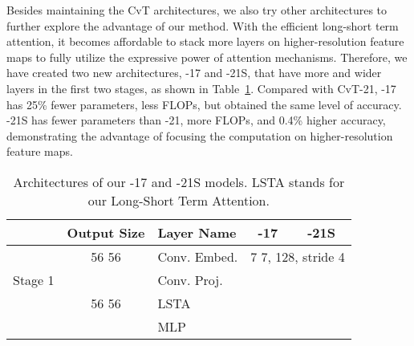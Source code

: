 Besides maintaining the CvT architectures, we also try other architectures to further explore the advantage of our method. With the efficient long-short term attention, it becomes affordable to stack more layers on higher-resolution feature maps to fully utilize the expressive power of attention mechanisms. Therefore, we have created two new architectures, \cvtname{}-17 and \cvtname{}-21S, that have more and wider layers in the first two stages, as shown in Table~\ref{tbl:cvt_customized}. Compared with CvT-21, \cvtname{}-17 has 25\% fewer parameters, less FLOPs, but obtained the same level of accuracy. \cvtname{}-21S has fewer parameters than \cvtname{}-21, more FLOPs, and 0.4\% higher accuracy, demonstrating the advantage of focusing the computation on higher-resolution feature maps.


\begin{table}[]
\centering
\caption{Architectures of our \cvtname{}-17 and \cvtname{}-21S models. LSTA stands for our Long-Short Term Attention.}
\label{tbl:cvt_customized}
\begin{tabular}{c|c|l|c|c}
\hline
                         & Output Size                  & Layer Name   & \cvtname{}-17                                                                                           & \cvtname{}-21S                                                                                          \\ \hline
\multirow{4}{*}{Stage 1} & 56  56                  & Conv. Embed. & \multicolumn{2}{c}{7  7, 128, stride 4}                                                                                                                                                               \\ \cline{2-5} 
                         & \multirow{4}{*}{56  56} & Conv. Proj.  & \multicolumn{2}{c}{\multirow{4}{*}{}}                                                                                   \\
                         &                              & \multirow{2}{*}{LSTA}       & \multicolumn{2}{c}{}               \\
                         &                              &                              & \multicolumn{2}{c}{}               \\
                         &                              & MLP          & \multicolumn{2}{c}{}                                                                                                                                                                                       \\ \hline

\end{tabular}
\end{table}
